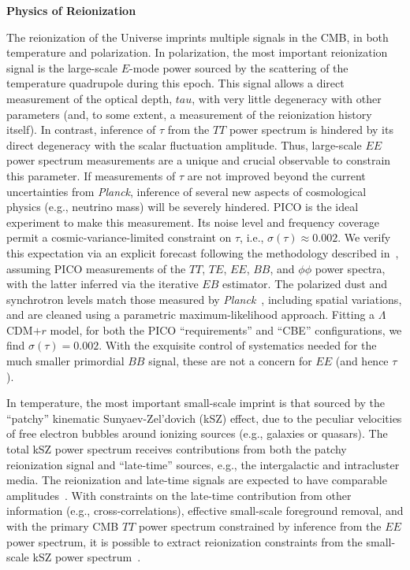 \documentclass[PICOReport.tex]{subfiles}
\begin{document}

{\bf Physics of Reionization}

The reionization of the Universe imprints multiple signals in the CMB, in both temperature and polarization.  In polarization, the most important reionization signal is the large-scale $E$-mode power sourced by the scattering of the temperature quadrupole during this epoch.  This signal allows a direct measurement of the optical depth, $tau$, with very little degeneracy with other parameters (and, to some extent, a measurement of the reionization history itself).  In contrast, inference of $\tau$ from the $TT$ power spectrum is hindered by its direct degeneracy with the scalar fluctuation amplitude.  Thus, large-scale $EE$ power spectrum measurements are a unique and crucial observable to constrain this parameter.  If measurements of $\tau$ are not improved beyond the current uncertainties from {\em Planck}, inference of several new aspects of cosmological physics (e.g., neutrino mass) will be severely hindered.  PICO is the ideal experiment to make this measurement.  Its noise level and frequency coverage permit a cosmic-variance-limited constraint on $\tau$, i.e., $\sigma(\tau) \approx 0.002$.  We verify this expectation via an explicit forecast following the methodology described in~\citet{errard_feeney_2015}, assuming PICO measurements of the $TT$, $TE$, $EE$, $BB$, and $\phi\phi$ power spectra, with the latter inferred via the iterative $EB$ estimator.  The polarized dust and synchrotron levels match those measured by {\em Planck}~\citep{PlanckFG2015}, including spatial variations, and are cleaned using a parametric maximum-likelihood approach.  Fitting a $\Lambda$CDM$+r$ model, for both the PICO ``requirements'' and ``CBE'' configurations, we find $\sigma(\tau) = 0.002$.  With the exquisite control of systematics needed for the much smaller primordial $BB$ signal, these are not a concern for $EE$ (and hence $\tau$).

In temperature, the most important small-scale imprint is that sourced by the ``patchy'' kinematic Sunyaev-Zel'dovich (kSZ) effect, due to the peculiar velocities of free electron bubbles around ionizing sources (e.g., galaxies or quasars).  The total kSZ power spectrum receives contributions from both the patchy reionization signal and ``late-time'' sources, e.g., the intergalactic and intracluster media.  The reionization and late-time signals are expected to have comparable amplitudes~\citep{Shaw2012,MMS2012,Battaglia2013}.  With constraints on the late-time contribution from other information (e.g., cross-correlations), effective small-scale foreground removal, and with the primary CMB $TT$ power spectrum constrained by inference from the $EE$ power spectrum, it is possible to extract reionization constraints from the small-scale kSZ power spectrum~\citep{calabrese/etal/2014}.
\end{document}

